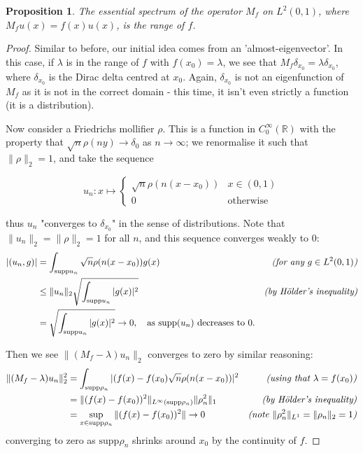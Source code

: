 \documentclass{article}
\newtheorem{proposition}{Proposition}
\newcommand{\supp}{\text{supp}}
\newcommand{\1}{\mathbf{1}}
\begin{document}
\begin{proposition}
The essential spectrum of the operator $M_f$ on $L^2(0, 1)$, where $M_f u(x) = f(x)u(x)$, is the range of $f$.
\end{proposition}
\begin{proof}
Similar to before, our initial idea comes from an 'almost-eigenvector'. In this case, if $\lambda$ is in the range
of $f$ with $f(x_0) = \lambda$, we see that $M_f \delta_{x_0} = \lambda \delta_{x_0}$, where $\delta_{x_0}$ is the
Dirac delta centred at $x_0$. Again, $\delta_{x_0}$ is not an eigenfunction of $M_f$ as it is not in the correct domain - this time, 
it isn't even strictly a function (it is a distribution).

Now consider a Friedrichs mollifier $\rho$. This is a function in $C^\infty_0(\mathbb{R})$ with the property that $\sqrt{n}\rho(ny) \rightarrow \delta_0$ as $n \rightarrow \infty$; we renormalise it such that $\|\rho\|_2 = 1$, and take the sequence 

$$u_n: x \mapsto 
\begin{cases}
  \sqrt{n}\rho(n(x-x_0)) & x \in (0, 1) \\
  0 & \text{otherwise}
\end{cases}
$$

thus $u_n$ "converges to $\delta_{x_0}$" in the sense of distributions. Note that $\|u_n\|_2 = \|\rho\|_2 = 1$ for all $n$, and this sequence converges weakly to 0:
\begin{align*}
|( u_n, g )| & = \int_{\supp{u_n}}\sqrt{n}\rho(n(x-x_0))g(x) & \text{\emph{(for any $g \in L^2(0, 1)$)}} \\
& \leq \|u_n\|_2 \sqrt{\int_{\supp{u_n}} |g(x)|^2} & \text{\emph{(by H\"older's inequality)}} \\
& = \sqrt{\int_{\supp{u_n}} |g(x)|^2} \rightarrow 0, \quad \text{as $\supp(u_n)$ decreases to 0.} &
\end{align*}

Then we see $\|(M_f - \lambda)u_n\|_2$ converges to zero by similar reasoning:
\begin{align*}
\|(M_f - \lambda)u_n\|^2_2 & = \int_{\supp \rho_n} |(f(x) - f(x_0) \sqrt{n} \rho(n(x-x_0))|^2 & \text{\emph{(using that $\lambda = f(x_0)$)}} \\
& = \|(f(x) - f(x_0))^2\|_{L^\infty (\supp \rho_n)} \|\rho_n^2\|_1 & \text{\emph{(by H\"older's inequality)}} \\
& = \sup_{x \in \supp \rho_n} \|(f(x) - f(x_0))^2\| \rightarrow 0 & \text{\emph{(note $\|\rho_n^2\|_{L^1} = \|\rho_n\|_2 = 1$)}} \\
\end{align*}
converging to zero as $\supp \rho_n$ shrinks around $x_0$ by the continuity of $f$.

\end{proof}

\printbibliography
\end{document}
